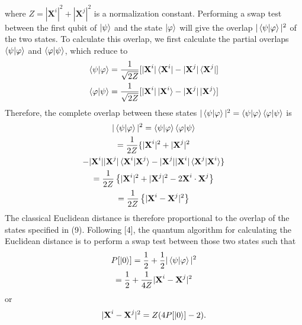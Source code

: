 \documentclass[twocolumn, english]{revtex4-2}
\begin{document}
where $Z = |\textbf{X}^{i}|^2+|\textbf{X}^{j}|^2$ is a normalization constant. Performing a swap test between the first qubit of $\ket{\psi}$ and the state $\ket{\varphi}$ will give the overlap $|\braket{\psi|\varphi}|^2$ of the two states. To calculate this overlap, we first calculate the partial overlaps $\braket{\psi|\varphi}$ and $\braket{\varphi|\psi}$, which reduce to
\begin{equation}\begin{gathered}
\braket{\psi|\varphi} = \frac{1}{\sqrt{2Z}}[|\textbf{X}^{i}|\bra{\textbf{X}^{i}} - |\textbf{X}^{j}|\bra{\textbf{X}^{j}}]\\
\braket{\varphi|\psi} = \frac{1}{\sqrt{2Z}}[|\textbf{X}^{i}|\ket{\textbf{X}^{i}} - |\textbf{X}^{j}|\ket{\textbf{X}^{j}}]
\end{gathered}\end{equation}
Therefore, the complete overlap between these states $|\braket{\psi|\varphi}|^{2} = \braket{\psi|\varphi}\braket{\varphi|\psi}$ is
\begin{equation}\begin{gathered}
|\braket{\psi|\varphi}|^{2} = \braket{\psi|\varphi}\braket{\varphi|\psi}\\
=\frac{1}{2Z}\{|\textbf{X}^{i}|^2+|\textbf{X}^{j}|^2\\-|\textbf{X}^{i}||\textbf{X}^{j}|\braket{\textbf{X}^{i}|\textbf{X}^{j}}-|\textbf{X}^{j}||\textbf{X}^{i}|\braket{\textbf{X}^{j}|\textbf{X}^{i}}\}\\
=\frac{1}{2Z}\left\{|\textbf{X}^{i}|^2+|\textbf{X}^{j}|^2-2\textbf{X}^{i}\cdot\textbf{X}^{j}\right\}\\
=\frac{1}{2Z}\left\{|\textbf{X}^{i}-\textbf{X}^{j}|^2\right\}
\end{gathered}\end{equation}
The classical Euclidean distance is therefore proportional to the overlap of the states specified in (9). Following [4], the quantum algorithm for calculating the Euclidean distance is to perform a swap test between those two states such that
\begin{equation}\begin{gathered}
P[\ket{0}] =  \frac{1}{2}+\frac{1}{2}|\braket{\psi|\varphi}|^2\\
= \frac{1}{2} + \frac{1}{4Z}|\textbf{X}^{i}-\textbf{X}^{j}|^2
\end{gathered}\end{equation}
or
\begin{equation}
|\textbf{X}^{i}-\textbf{X}^{j}|^2=Z(4P[\ket{0}]-2).
\end{equation}
\end{document}
